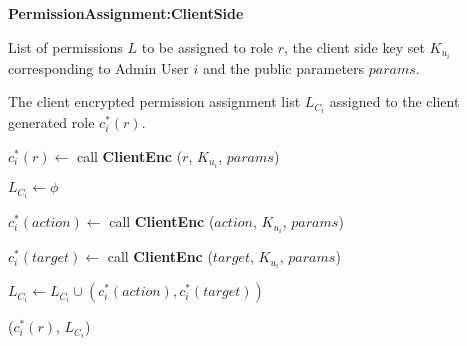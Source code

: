 \documentclass[final,5p,times,twocolumn]{elsarticle}
\newcommand{\algofontsize}{\fontsize{7}{8}\selectfont}
\begin{document}
\begin{algorithm}[htp]
{\algofontsize
\caption{\textbf{PermissionAssignment:ClientSide}}

\label{algo:deploy-permission-assignment-client-side}

\begin{algorithmic}[1]

\REQUIRE List of permissions $L$ to be assigned to role $r$, the client side key set $K_{u_i}$ corresponding to Admin User $i$ and the public parameters $params$.

\ENSURE The client encrypted permission assignment list $L_{C_i}$ assigned to the client generated role $c^*_i (r)$.

\medskip

\STATE $c^*_i (r) \leftarrow$ call \textbf{ClientEnc} ($r$, $K_{u_i}$, $params$) \label{line:deploy-pa-cs-role}

\STATE $L_{C_i} \leftarrow \phi$ \label{line:deploy-pa-cs-init}

 \label{line:deploy-pa-cs-loop}

	\STATE $c^*_i (action) \leftarrow$ call \textbf{ClientEnc} ($action$, $K_{u_i}$, $params$) \label{line:deploy-pa-cs-action}
	
	\STATE $c^*_i (target) \leftarrow$ call \textbf{ClientEnc} ($target$, $K_{u_i}$, $params$) \label{line:deploy-pa-cs-target}
	
	\STATE $L_{C_i} \leftarrow L_{C_i} \cup (c^*_i (action), c^*_i (target))$ \label{line:deploy-pa-cs-update}

\ENDFOR

\RETURN ($c^*_i (r)$, $L_{C_i}$)

\end{algorithmic}
}
\end{algorithm}
\end{document}
